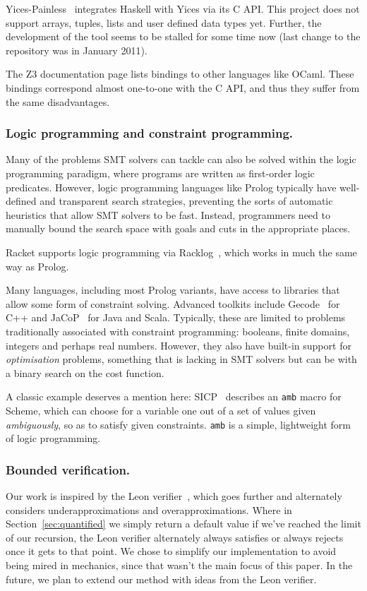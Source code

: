 Yices-Painless~\cite{yices-painless} integrates Haskell with Yices via its C
API. This project does not support arrays, tuples, lists and user defined data
types yet. Further, the development of the tool seems to be stalled for some
time now (last change to the repository was in January 2011).

The Z3 documentation page lists bindings to other languages like OCaml. These
bindings correspond almost one-to-one with the C API, and thus they suffer
from the same disadvantages.

\subsubsection{Logic programming and constraint programming.}

Many of the problems SMT solvers can tackle can also be solved within the
logic programming paradigm, where programs are written as first-order logic
predicates. However, logic programming languages like Prolog typically have
well-defined and transparent search strategies, preventing the sorts of
automatic heuristics that allow SMT solvers to be fast. Instead, programmers
need to manually bound the search space with goals and cuts in the appropriate
places.

Racket supports logic programming via Racklog~\cite{racklog}, which works in
much the same way as Prolog.

Many languages, including most Prolog variants, have access to libraries that
allow some form of constraint solving. Advanced toolkits include
Gecode~\cite{gecode} for C++ and JaCoP~\cite{JaCoP} for Java and Scala.
Typically, these are limited to problems traditionally associated with
constraint programming: booleans, finite domains, integers and perhaps real
numbers. However, they also have built-in support for \textit{optimisation}
problems, something that is lacking in SMT solvers but can be with a binary
search on the cost function.

A classic example deserves a mention here: SICP~\cite[Section~4.3]{sicp}
describes an \texttt{amb} macro for Scheme, which can choose for a variable
one out of a set of values given \textit{ambiguously}, so as to satisfy given
constraints. \texttt{amb} is a simple, lightweight form of logic programming.

\subsubsection{Bounded verification.}

Our work is inspired by the Leon verifier~\cite{sat-recursive}, which goes
further and alternately considers underapproximations and overapproximations.
Where in Section~\ref{sec:quantified} we simply return a default value if
we've reached the limit of our recursion, the Leon verifier alternately always
satisfies or always rejects once it gets to that point. We chose to simplify
our implementation to avoid being mired in mechanics, since that wasn't the
main focus of this paper. In the future, we plan to extend our method with
ideas from the Leon verifier.
